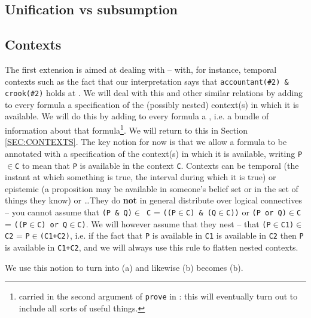\documentclass[11pt,a4paper]{article}
\newcommand{\IN}{$\in$}
\begin{document}
\subsection{Unification vs subsumption}



\subsection{Contexts}

The first extension is aimed at dealing with  -- with, for
instance, temporal contexts such as
the fact that our interpretation 
says that \texttt{accountant(\#2) \& crook(\#2)} holds at
. We will deal with this and other similar
relations by adding to every formula a specification of the (possibly
nested) context(s) in which it is available. We will do this by adding to
every formula a  \citep{Gabbay:89,Gabbay:96}, i.e. a
bundle of information about that formula\footnote{carried in the second
argument of \texttt{prove} in : this will eventually turn
out to include all sorts of useful things.}. We will return to this in
Section \ref{SEC:CONTEXTS}. The key notion for now is that we allow a
formula to be annotated with a specification of the context(s) in which
it is available, writing \texttt{P{\IN}C} to mean that \texttt{P} is
available in the context \texttt{C}. Contexts can be temporal (the instant at which something
is true, the interval during which it is true) or epistemic (a
proposition may be available in someone's belief set or in the set of
things they know) or \ldots They do \textbf{not} in general distribute
over logical connectives -- you cannot assume that \texttt{(P \& Q)\IN
  C} = \texttt{((P{\IN}C) \& (Q{\IN}C))} or \texttt{(P or Q){\IN}C} =
\texttt{((P{\IN}C) or Q{\IN}C)}. We will however assume that they nest
-- that \texttt{(P{\IN}C1){\IN}C2} = \texttt{P\IN(C1+C2)}, i.e. if the fact
that \texttt{P} is available in \texttt{C1} is available in
\texttt{C2} then \texttt{P} is available in \texttt{C1+C2}, and we
will always use this rule to flatten nested contexts.

We use this notion to turn 
into (a) and likewise (b) becomes  (b).
\end{document}
